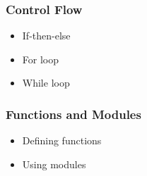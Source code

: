 
\begin{frame}
  \MyLogo
  \frametitle{Control Flow}  
\small

\begin{itemize}
	\item If-then-else
	\item For loop
	\item While loop
\end{itemize}

\end{frame}


\begin{frame}
  \MyLogo
  \frametitle{Functions and Modules}  
\small

\begin{itemize}
	\item Defining functions
	\item Using modules
\end{itemize}

\end{frame}
